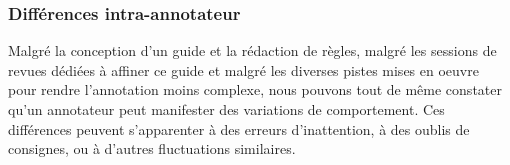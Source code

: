 		\subsubsection{Différences intra-annotateur}
		\label{section:2.3.3.B-DEFIS-ANNOTATION-ASPECT-HUMAIN-INTRA-ANNOTATEUR}
		
			Malgré la conception d'un guide et la rédaction de règles, malgré les sessions de revues dédiées à affiner ce guide et malgré les diverses pistes mises en oeuvre pour rendre l'annotation moins complexe, nous pouvons tout de même constater qu'un annotateur peut manifester des variations de comportement.
			Ces différences peuvent s'apparenter à des erreurs d'inattention, à des oublis de consignes, ou à d'autres fluctuations similaires.
			
